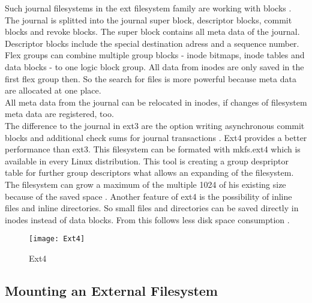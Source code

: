 Such journal filesystems in the ext filesystem family are working with blocks \cite[~p.20]{Seufert2015}.
The journal is splitted into the journal super block, descriptor blocks, commit blocks and revoke blocks.
The super block contains all meta data of the journal. Descriptor blocks include the special destination adress and a sequence number. 
Flex groups can combine multiple group blocks - inode bitmaps, inode tables and data blocks - to one logic block group. All data from inodes are only saved in the first flex group then. 
So the search for files is more powerful because meta data are allocated at one place.\\
All meta data from the journal can be relocated in inodes, if changes of filesystem meta data are registered, too. \\
The difference to the journal in ext3 are the option writing asynchronous commit blocks and additional check sums for journal transactions \cite[~p.28]{Seufert2015}.
Ext4 provides a better performance than ext3. 
This filesystem can be formated with mkfs.ext4 which is available in every Linux distribution.
This tool is creating a group despriptor table for further group descriptors what allows an expanding of the filesystem. The filesystem can grow a maximum of the multiple 1024 of his existing size because of the saved space \cite[~p.21]{Seufert2015}. 
Another feature of ext4 is the possibility of inline files and inline directories. So small files and directories can be saved directly in inodes instead of data blocks. From this follows less disk space consumption \cite[p.24]{Seufert2015}.

\begin{figure}[H]
\centering
\texttt{[image: Ext4]}
 \caption{Ext4}
    \label{Ext4}
\end{figure}

\subsection{Mounting an External Filesystem} \label{ExternalFilesystem}

